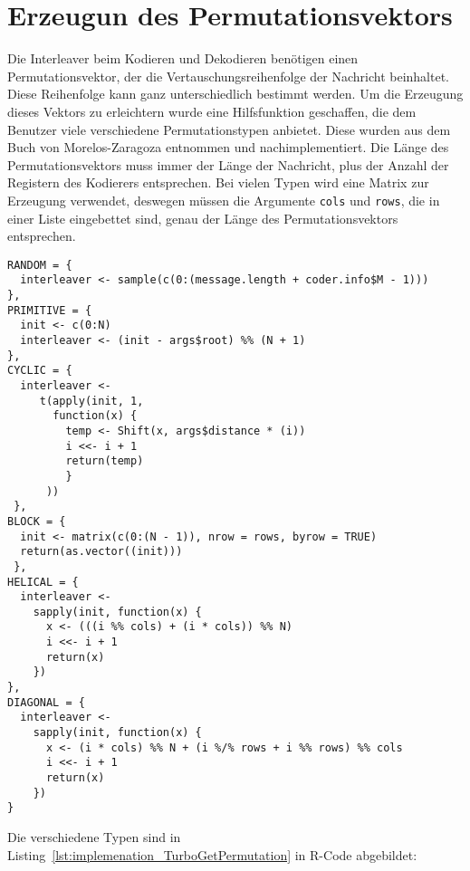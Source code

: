 \section{Erzeugun des Permutationsvektors}
\label{sec:implementation_permutation}
Die Interleaver beim Kodieren und Dekodieren benötigen einen Permutationsvektor, der die Vertauschungsreihenfolge der Nachricht beinhaltet. Diese Reihenfolge kann ganz unterschiedlich bestimmt werden. Um die Erzeugung dieses Vektors zu erleichtern wurde eine Hilfsfunktion geschaffen, die dem Benutzer viele verschiedene Permutationstypen anbietet. Diese wurden aus dem Buch von Morelos-Zaragoza \cite{morelos2006art} entnommen und nachimplementiert. Die Länge des Permutationsvektors muss immer der Länge der Nachricht, plus der Anzahl der Registern des Kodierers entsprechen. Bei vielen Typen wird eine Matrix zur Erzeugung verwendet, deswegen müssen die Argumente \texttt{cols} und \texttt{rows}, die in einer Liste eingebettet sind, genau der Länge des Permutationsvektors entsprechen.

\begin{lstlisting}[caption=Implementierung von \texttt{TurboGetPermutation}, label={lst:implemenation_TurboGetPermutation}, float=!th]
RANDOM = {
  interleaver <- sample(c(0:(message.length + coder.info$M - 1)))
},
PRIMITIVE = {
  init <- c(0:N)
  interleaver <- (init - args$root) %% (N + 1)
},
CYCLIC = {
  interleaver <-
     t(apply(init, 1,
       function(x) {
         temp <- Shift(x, args$distance * (i))
         i <<- i + 1
         return(temp)
         }
      ))
 },
BLOCK = {
  init <- matrix(c(0:(N - 1)), nrow = rows, byrow = TRUE)
  return(as.vector((init)))
 },
HELICAL = {
  interleaver <-
    sapply(init, function(x) {
      x <- (((i %% cols) + (i * cols)) %% N)
      i <<- i + 1
      return(x)
    })
},
DIAGONAL = {
  interleaver <-
    sapply(init, function(x) {
      x <- (i * cols) %% N + (i %/% rows + i %% rows) %% cols
      i <<- i + 1
      return(x)
    })
}
\end{lstlisting}

Die verschiedene Typen sind in Listing~\ref{lst:implemenation_TurboGetPermutation} in R-Code abgebildet:


